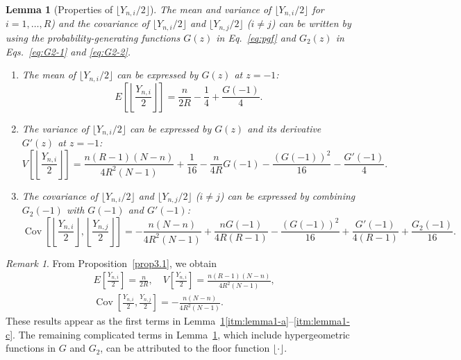 \documentclass[pre, amsmath, floatfix]{revtex4-2}
\theoremstyle{plain}
\newtheorem{lemma}{Lemma}[section]
\theoremstyle{definition}
\theoremstyle{remark}
\newtheorem{remark}{Remark}[section]
\newcommand{\E}[1]{E\left[#1\right]} %
\newcommand{\Var}[1]{V\left[#1\right]} %
\DeclareMathOperator{\cov}{Cov} %
\newcommand{\Cov}[2]{\cov\left[#1, #2\right]}
\begin{document}
\begin{lemma}[Properties of $\lfloor Y_{n,i}/2\rfloor$]\label{lemma1}
The mean and variance of $\lfloor Y_{n,i}/2\rfloor$ for $i=1,\ldots,R$) and the covariance of $\lfloor Y_{n,i}/2\rfloor$ and $\lfloor Y_{n,j}/2\rfloor$ \textup{(}$i\ne j$\textup{)} can be written by using the probability-generating functions $G(z)$ in Eq.~\eqref{eq:pgf} and $G_2(z)$ in Eqs.~\eqref{eq:G2-1} and \eqref{eq:G2-2}.
\begin{enumerate}
\renewcommand{\labelenumi}{$\mathrm{(\alph{enumi})}$}
\renewcommand{\theenumi}{\labelenumi}
\item\label{itm:lemma1-a} The mean of $\lfloor Y_{n,i}/2\rfloor$ can be expressed by $G(z)$ at $z=-1$:
\[
\E{\left\lfloor\dfrac{Y_{n,i}}{2}\right\rfloor}=\frac{n}{2R}-\frac{1}{4}+\frac{G(-1)}{4}.
\]
\item\label{itm:lemma1-b} The variance of $\lfloor Y_{n,i}/2\rfloor$ can be expressed by $G(z)$ and its derivative $G'(z)$ at $z=-1$:
\[
\Var{\left\lfloor\dfrac{Y_{n,i}}{2}\right\rfloor}=\frac{n(R-1)(N-n)}{4R^2(N-1)}+\frac{1}{16}-\frac{n}{4R}G(-1)-\frac{(G(-1))^2}{16}-\frac{G'(-1)}{4}.
\]
\item\label{itm:lemma1-c} The covariance of $\lfloor Y_{n,i}/2\rfloor$ and $\lfloor Y_{n,j}/2\rfloor$ \textup{(}$i\ne j$\textup{)} can be expressed by combining $G_2(-1)$ with $G(-1)$ and $G'(-1)$:
\[
\Cov{\left\lfloor\dfrac{Y_{n,i}}{2}\right\rfloor}{\left\lfloor\dfrac{Y_{n,j}}{2}\right\rfloor}=-\frac{n(N-n)}{4R^2(N-1)}+\frac{nG(-1)}{4R(R-1)}-\frac{(G(-1))^2}{16}+\frac{G'(-1)}{4(R-1)}+\frac{G_2(-1)}{16}.
\]
\end{enumerate}
\end{lemma}

\begin{remark}
From Proposition~\ref{prop3.1}, we obtain
\begin{align*}
&\E{\frac{Y_{n,i}}{2}}=\frac{n}{2R},\quad
\Var{\frac{Y_{n,i}}{2}}=\frac{n(R-1)(N-n)}{4R^2(N-1)},\\
&\Cov{\frac{Y_{n,i}}{2}}{\frac{Y_{n,j}}{2}}=-\frac{n(N-n)}{4R^2(N-1)}.
\end{align*}
These results appear as the first terms in Lemma~\ref{lemma1}\ref{itm:lemma1-a}--\ref{itm:lemma1-c}.
The remaining complicated terms in Lemma~\ref{lemma1}, which include hypergeometric functions in $G$ and $G_2$, can be attributed to the floor function $\lfloor\cdot\rfloor$.
\end{remark}
\end{document}
